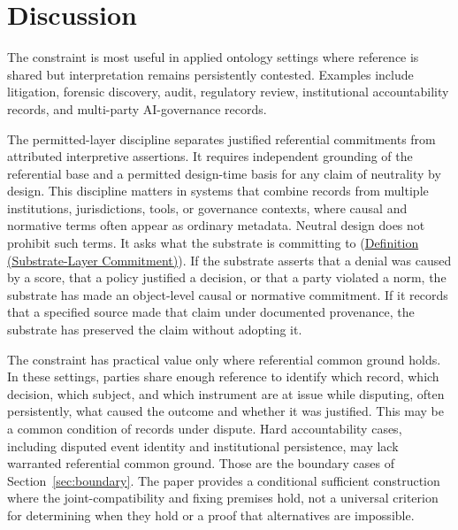 \documentclass[11pt]{article}
\theoremstyle{plain}
\theoremstyle{definition}
\theoremstyle{remark}
\newcommand{\DefRef}[2]{\hyperref[#1]{Definition (#2)}}
\newcommand{\SecRef}[1]{Section~\ref{#1}}
\begin{document}
\section{Discussion}
\label{sec:discussion}

The constraint is most useful in applied ontology settings
where reference is shared but interpretation remains persistently contested.
Examples include
litigation,
forensic discovery,
audit,
regulatory review,
institutional accountability records, and
multi-party AI-governance records.

The permitted-layer discipline separates justified referential
commitments from attributed interpretive assertions.
It requires independent grounding of the referential base
and a permitted design-time basis for any claim of neutrality by design.
This discipline matters in systems that combine records from multiple
institutions, jurisdictions, tools, or governance contexts,
where causal and normative terms often appear as ordinary metadata.
Neutral design does not prohibit such terms.
It asks what the substrate is committing to
(\DefRef{se100.def.SubstrateCommitment}{Substrate-Layer Commitment}).
If the substrate asserts that a denial was caused by a score,
that a policy justified a decision,
or that a party violated a norm,
the substrate has made an object-level causal or normative commitment.
If it records that a specified source made that claim under documented
provenance,
the substrate has preserved the claim without adopting it.

The constraint has practical value only where referential common ground holds.
In these settings, parties share enough reference
to identify which record,
which decision, which subject, and which instrument are at issue while disputing,
often persistently, what caused the outcome and whether it was justified.
This may be a common condition of records under dispute.
Hard accountability cases, including disputed event identity
and institutional persistence, may lack warranted referential common ground.
Those are the boundary cases of \SecRef{sec:boundary}.
The paper provides a conditional sufficient construction where the
joint-compatibility and fixing premises hold, not a universal criterion
for determining when they hold or a proof that alternatives are impossible.

\end{document}
